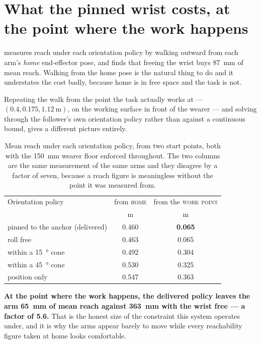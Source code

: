 \section{What the pinned wrist costs, at the point where the work happens}
\label{sec:work-point}

 measures reach under each orientation policy by
walking outward from each arm's \emph{home} end-effector pose, and finds that
freeing the wrist buys \SI{87}{\milli\metre} of mean reach. Walking from the
home pose is the natural thing to do and it understates the cost badly,
because home is in free space and the task is not.

Repeating the walk from the point the task actually works at ---
$(\num{0.4}, \num{0.175}, \SI{1.12}{\metre})$, on the working surface in front
of the wearer --- and solving through the follower's own orientation policy
rather than against a continuous bound, gives a different picture entirely.

\begin{table}[htbp]
  \centering
  \small
  \caption[Reach from home and from the work point]{Mean reach under each
  orientation policy, from two start points, both with the
  \SI{150}{\milli\metre} wearer floor enforced throughout. The two columns are
  the same measurement of the same arms and they disagree by a factor of
  seven, because a reach figure is meaningless without the point it was
  measured from.}
  \label{tab:work-point}
  \begin{tabular}{@{}lcc@{}}
    \toprule
    Orientation policy & from \textsc{home} & from the \textsc{work point} \\
    & \si{\metre} & \si{\metre} \\
    \midrule
    pinned to the anchor (delivered) & \num{0.460} & \textbf{\num{0.065}} \\
    roll free                        & \num{0.463} & \num{0.065} \\
    within a \SI{15}{\degree} cone   & \num{0.492} & \num{0.304} \\
    within a \SI{45}{\degree} cone   & \num{0.530} & \num{0.325} \\
    position only                    & \num{0.547} & \num{0.363} \\
    \bottomrule
  \end{tabular}
\end{table}

\textbf{At the point where the work happens, the delivered policy leaves the
arm \SI{65}{\milli\metre} of mean reach against \SI{363}{\milli\metre} with
the wrist free --- a factor of \num{5.6}.} That is the honest size of the
constraint this system operates under, and it is why the arms appear barely to
move while every reachability figure taken at home looks comfortable.

